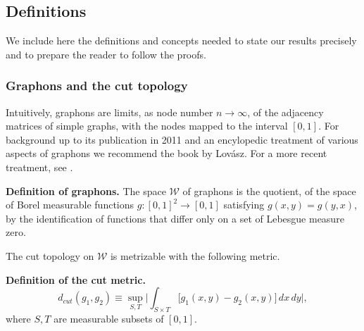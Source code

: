 \documentclass[12pt]{amsart}
\newcommand\be{\begin{equation}}
\newcommand\ee{\end{equation}}
\newcommand{\G}{\mathbb{G}}
\newcommand{\regular}{\mathcal{W}}
\begin{document}
{\bigskip
\subsection {\label{Definitions} {Definitions}}

We include here the definitions and concepts
needed to state our results precisely and to prepare the
reader to follow the proofs. 


\subsubsection{Graphons and the cut topology}
\phantom{asdf}

Intuitively, graphons are limits, as node number $n\to 
\infty$, of the adjacency matrices of simple graphs, 
with the nodes mapped to the interval $[0,1]$. For 
background up to its publication in 2011 and an 
encylopedic treatment of various aspects of graphons we 
recommend the book \cite{Lov} by Lov\'{a}sz. For a 
more recent treatment, see \cite{Ch}.

\noindent \textbf{Definition of graphons.} The space $\regular$ of graphons is the quotient, of the space of Borel measurable functions
$g: [0,1]^2 \to [0,1]$ satisfying $g(x,y)=g(y,x)$, by the identification of functions that differ only on a set of Lebesgue measure zero.

The cut topology on $\regular$ is metrizable with the following {metric}.

\noindent \textbf{Definition of the cut metric.} 
\be d_{cut}(g_1, g_2) \equiv \sup_{S,T}\Big|\int_{S \times T} 
\big [ g_1(x,y) - g_2(x,y) \big ] \,dx\, dy\Big|, 
\ee
where $S,T$ are measurable subsets 
of $[0,1]$.
%
%
%
%


}
\end{document}
